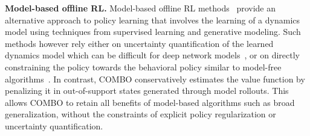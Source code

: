
\textbf{Model-based offline RL.} Model-based offline RL methods~\citep{finn2017deep, ebert2018visual, kahn2018composable, kidambi2020morel, yu2020mopo, matsushima2020deployment, argenson2020model, swazinna2020overcoming,Rafailov2020LOMPO, lee2021representation} provide an alternative approach to policy learning that involves the learning of a dynamics model using techniques from supervised learning and generative modeling. Such methods however rely either on uncertainty quantification of the learned dynamics model which can be difficult for deep network models~\cite{ovadia2019can}, or on directly constraining the policy towards the behavioral policy similar to model-free algorithms~\cite{matsushima2020deployment}. In contrast, COMBO conservatively estimates the value function by penalizing it in out-of-support states generated through model rollouts. This allows COMBO to retain all benefits of model-based algorithms such as broad generalization, without the constraints of explicit policy regularization or uncertainty quantification.
